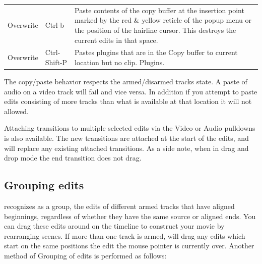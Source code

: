 \begin{center}
\begin{longtable}{p{}
    p{} p{}
    }
    Overwrite & Ctrl-b & Paste contents of the copy buffer at the
                         insertion point marked by the red \& yellow
                         reticle of the popup menu or the position
                         of the hairline cursor. This destroys the
                         current edits in that space.\\

    Overwrite & Ctrl-Shift-P & Pastes plugins that are in the Copy
                               buffer to current location but no
                               clip. Plugins.\\
    \bottomrule
  \end{longtable}
\end{center}
\renewcommand{\arraystretch}{1}

The copy/paste behavior respects the armed/disarmed tracks
state.  A paste of audio on a video track will fail and vice versa.
In addition if you attempt to paste edits consisting of more tracks
than what is available at that location it will not allowed.

Attaching transitions to multiple selected edits via the Video or
Audio pulldowns is also available.  The new transitions are attached
at the start of the edits, and will replace any existing attached
transitions.  As a side note, when in drag and drop mode the end
transition does not drag.

\subsection{Grouping edits}%
\label{sub:grouping_edits}

\CGG{} recognizes as a group, the edits of different armed tracks
that have aligned beginnings, regardless of whether they have the
same source or aligned ends.  You can drag these edits around on the
timeline to construct your movie by rearranging scenes. If more than
one track is armed, \CGG{} will drag any edits which start on the
same positions the edit the mouse pointer is currently over. Another
method of Grouping of edits is performed as follows:

